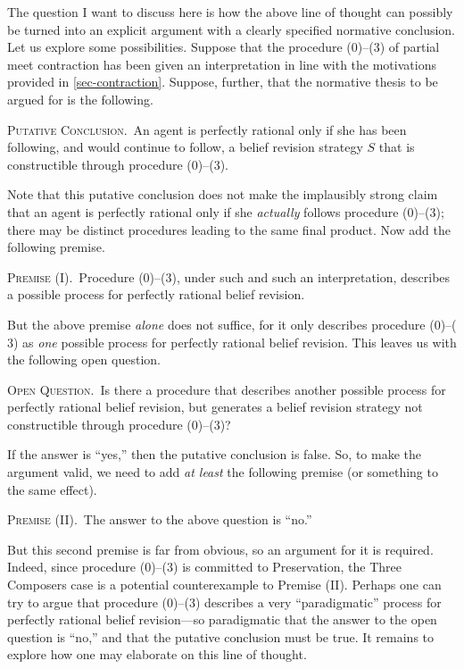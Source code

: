 The question I want to discuss here is how the above line of thought can possibly be turned into an explicit argument with a clearly specified normative conclusion. Let us explore some possibilities. Suppose that the procedure ($0$)--($3$) of partial meet contraction has been given an interpretation in line with the motivations provided in \autoref{sec-contraction}. Suppose, further, that the normative thesis to be argued for is the following. \op

	\xm \textsc{Putative Conclusion.}\, An agent is perfectly rational only if she has been following, and would continue to follow, a belief revision strategy $S$ that is constructible through procedure ($0$)--($3$).

\ed Note that this putative conclusion does not make the implausibly strong claim that an agent is perfectly rational only if she {\em actually} follows procedure ($0$)--($3$); there may be distinct procedures leading to the same final product. Now add the following premise. \op

	\xm \textsc{Premise (I).}\, Procedure ($0$)--($3$), under such and such an interpretation, describes a possible process for perfectly rational belief revision.

\ed But the above premise {\em alone} does not suffice, for it only describes procedure ($0$)--($3$) as {\em one} possible process for perfectly rational belief revision. This leaves us with the following open question. \op

	\xm \textsc{Open Question.}\, Is there a procedure that describes another possible process for perfectly rational belief revision, but generates a belief revision strategy not constructible through procedure ($0$)--($3$)? 

\ed 
If the answer is ``yes,'' then the putative conclusion is false. So, to make the argument valid, we need to add {\em at least} the following premise (or something to the same effect). \op

	\xm \textsc{Premise (II).}\, The answer to the above question is ``no.'' 

\ed But this second premise is far from obvious, so an argument for it is required. Indeed, since procedure ($0$)--($3$) is committed to Preservation, the Three Composers case is a potential counterexample to Premise (II).  Perhaps one can try to argue that procedure ($0$)--($3$) describes a very ``paradigmatic'' process for perfectly rational belief revision---so paradigmatic that the answer to the open question is ``no,'' and that the putative conclusion must be true. It remains to explore how one may elaborate on this line of thought. 

